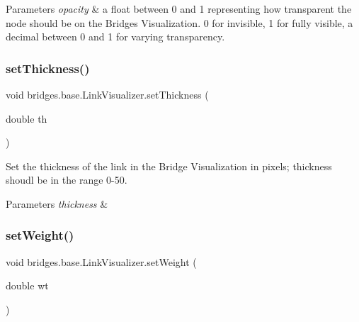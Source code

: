 \begin{DoxyParams}{Parameters}
{\em opacity} & a float between 0 and 1 representing how transparent the node should be on the Bridges Visualization. 0 for invisible, 1 for fully visible, a decimal between 0 and 1 for varying transparency. \\
\hline
\end{DoxyParams}
\mbox{\label{classbridges_1_1base_1_1_link_visualizer_a702e9ca345d1a4a035baf2041f275849}} 
\subsubsection{\texorpdfstring{set\+Thickness()}{setThickness()}}
{\footnotesize\ttfamily void bridges.\+base.\+Link\+Visualizer.\+set\+Thickness (\begin{DoxyParamCaption}\item[{double}]{th }\end{DoxyParamCaption})}

Set the thickness of the link in the Bridge Visualization in pixels; thickness shoudl be in the range 0-\/50.


\begin{DoxyParams}{Parameters}
{\em thickness} & \\
\hline
\end{DoxyParams}
\mbox{\label{classbridges_1_1base_1_1_link_visualizer_a21d5884d243cf5a08f9d544f5083a44c}} 
\subsubsection{\texorpdfstring{set\+Weight()}{setWeight()}}
{\footnotesize\ttfamily void bridges.\+base.\+Link\+Visualizer.\+set\+Weight (\begin{DoxyParamCaption}\item[{double}]{wt }\end{DoxyParamCaption})}


